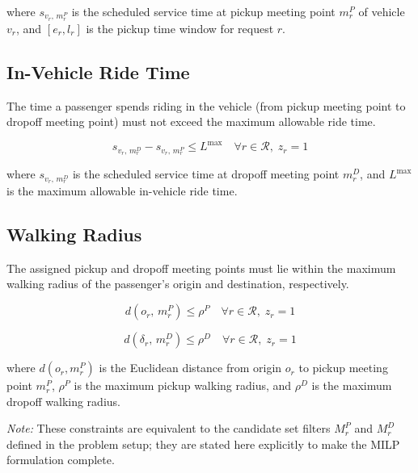 where $s_{v_r,\, m_r^P}$ is the scheduled service time at pickup meeting point $m_r^P$ of
vehicle $v_r$, and $[e_r, l_r]$ is the pickup time window for request $r$.

\subsection*{In-Vehicle Ride Time}

The time a passenger spends riding in the vehicle (from pickup meeting point to dropoff meeting
point) must not exceed the maximum allowable ride time.

\begin{equation}\label{con:ridetime}
  s_{v_r,\, m_r^D} - s_{v_r,\, m_r^P} \leq L^{\max} \quad \forall r \in \mathcal{R},\; z_r = 1
\end{equation}

where $s_{v_r,\, m_r^D}$ is the scheduled service time at dropoff meeting point $m_r^D$, and
$L^{\max}$ is the maximum allowable in-vehicle ride time.

\subsection*{Walking Radius}

The assigned pickup and dropoff meeting points must lie within the maximum walking radius of
the passenger's origin and destination, respectively.

\begin{equation}\label{con:walk-pickup}
  d(o_r,\, m_r^P) \leq \rho^P \quad \forall r \in \mathcal{R},\; z_r = 1
\end{equation}

\begin{equation}\label{con:walk-dropoff}
  d(\delta_r,\, m_r^D) \leq \rho^D \quad \forall r \in \mathcal{R},\; z_r = 1
\end{equation}

where $d(o_r, m_r^P)$ is the Euclidean distance from origin $o_r$ to pickup meeting point
$m_r^P$, $\rho^P$ is the maximum pickup walking radius, and $\rho^D$ is the maximum dropoff
walking radius.

\textit{Note:} These constraints are equivalent to the candidate set filters $M_r^P$ and
$M_r^D$ defined in the problem setup; they are stated here explicitly to make the MILP
formulation complete.

